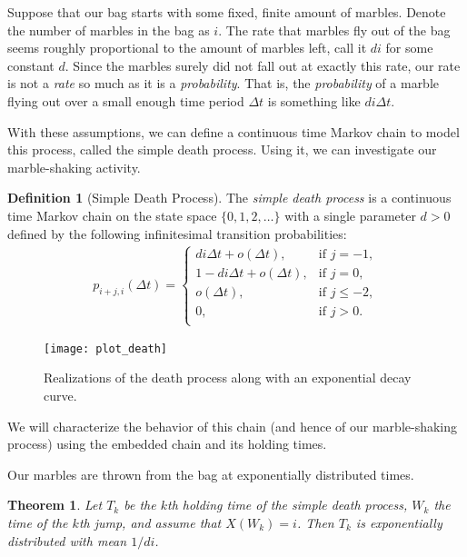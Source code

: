 \documentclass[12pt]{article}
\newtheorem{thm}{Theorem}[section]
\theoremstyle{definition}
\newtheorem{defn}{Definition}
\begin{document}
Suppose that our bag starts with some fixed, finite amount of marbles. Denote
the number of marbles in the bag as $i$. The rate that marbles fly out of the
bag seems roughly proportional to the amount of marbles left, call it $di$ for
some constant $d$. Since the marbles surely did not fall out at exactly this
rate, our rate is not a \emph{rate} so much as it is a \emph{probability}.
That is, the \emph{probability} of a marble flying out over a small enough time
period $\Delta t$ is something like $di \Delta t$.

With these assumptions, we can define a continuous time Markov chain to model
this process, called the simple death process. Using it, we can investigate our
marble-shaking activity.

\begin{defn}[Simple Death Process]
The \emph{simple death process} is a continuous time Markov chain on the state
space $\{0, 1, 2, \dots\}$ with a single parameter $d > 0$ defined by the
following infinitesimal transition probabilities:
\begin{align*}
    p_{i + j, i}(\Delta t) =
    \begin{cases}
        di \Delta t + o(\Delta t), & \text{if } j = -1, \\
        1 - di \Delta t + o(\Delta t), & \text{if } j = 0, \\
        o(\Delta t), & \text{if } j \leq -2, \\
        0, & \text{if } j > 0. \\
    \end{cases}
\end{align*}
\end{defn}

\begin{figure}[h]
    \centering
    \texttt{[image: plot\_death]}
    \caption{Realizations of the death process along with an exponential decay
    curve.}
    \label{fig:plot_death}
\end{figure}

We will characterize the behavior of this chain (and hence of our
marble-shaking process) using the embedded chain and its holding times.

Our marbles are thrown from the bag at exponentially distributed times.

\begin{thm}
    \label{thm:holding-time}
    Let $T_k$ be the $k$th holding time of the simple death process, $W_k$ the
    time of the $k$th jump, and assume that $X(W_k) = i$. Then $T_k$ is
    exponentially distributed with mean $1/di$.
\end{thm}
\end{document}
